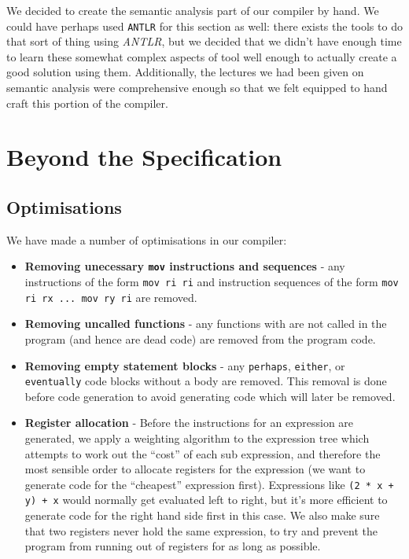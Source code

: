 \documentclass[11pt, notitlepage]{report}
\begin{document}
We decided to create the semantic analysis part of our compiler by hand. We could have perhaps used \texttt{ANTLR} for this section as well: there exists the tools to do that sort of thing using \emph{ANTLR}, but we decided that we didn't have enough time to learn these somewhat complex aspects of tool well enough to actually create a good solution using them. Additionally, the lectures we had been given on semantic analysis were comprehensive enough so that we felt equipped to hand craft this portion of the compiler.

\section*{Beyond the Specification}
\subsection*{Optimisations}
We have made a number of optimisations in our compiler:
\begin{itemize}
\item \textbf{Removing unecessary \texttt{mov} instructions and sequences} - any instructions of the form \texttt{mov ri ri} and instruction sequences of the form \texttt{mov ri rx ... mov ry ri} are removed.
\item \textbf{Removing uncalled functions} - any functions with are not called in the program (and hence are dead code) are removed from the program code.
\item \textbf{Removing empty statement blocks} - any \texttt{perhaps}, \texttt{either}, or \texttt{eventually} code blocks without a body are removed. This removal is done before code generation to avoid generating code which will later be removed.
\item \textbf{Register allocation} - Before the instructions for an expression are generated, we apply a weighting algorithm to the expression tree which attempts to work out the ``cost'' of each sub expression, and therefore the most sensible order to allocate registers for the expression (we want to generate code for the ``cheapest'' expression first). Expressions like \texttt{(2 * x + y) + x} would normally get evaluated left to right, but it's more efficient to generate code for the right hand side first in this case. We also make sure that two registers never hold the same expression, to try and prevent the program from running out of registers for as long as possible.
\end{itemize}
\end{document}
